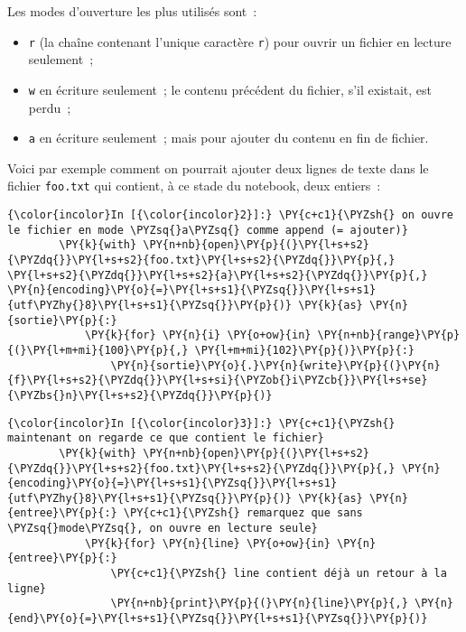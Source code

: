     Les modes d'ouverture les plus utilisés sont~:
  
\begin{itemize}
	\item
	\texttt{\textquotesingle{}r\textquotesingle{}} (la chaîne contenant
	l'unique caractère \texttt{r}) pour ouvrir un fichier en lecture
	seulement~;
	\item
	\texttt{\textquotesingle{}w\textquotesingle{}} en écriture
	seulement~; le contenu précédent du fichier, s'il existait, est perdu~;
	\item
	\texttt{\textquotesingle{}a\textquotesingle{}} en écriture seulement~;
	mais pour ajouter du contenu en fin de fichier.
\end{itemize}

    Voici par exemple comment on pourrait ajouter deux lignes de texte dans
le fichier \texttt{foo.txt} qui contient, à ce stade du notebook, deux
entiers~:

    \begin{Verbatim}[commandchars=\\\{\}]
{\color{incolor}In [{\color{incolor}2}]:} \PY{c+c1}{\PYZsh{} on ouvre le fichier en mode \PYZsq{}a\PYZsq{} comme append (= ajouter)}
        \PY{k}{with} \PY{n+nb}{open}\PY{p}{(}\PY{l+s+s2}{\PYZdq{}}\PY{l+s+s2}{foo.txt}\PY{l+s+s2}{\PYZdq{}}\PY{p}{,} \PY{l+s+s2}{\PYZdq{}}\PY{l+s+s2}{a}\PY{l+s+s2}{\PYZdq{}}\PY{p}{,} \PY{n}{encoding}\PY{o}{=}\PY{l+s+s1}{\PYZsq{}}\PY{l+s+s1}{utf\PYZhy{}8}\PY{l+s+s1}{\PYZsq{}}\PY{p}{)} \PY{k}{as} \PY{n}{sortie}\PY{p}{:}
            \PY{k}{for} \PY{n}{i} \PY{o+ow}{in} \PY{n+nb}{range}\PY{p}{(}\PY{l+m+mi}{100}\PY{p}{,} \PY{l+m+mi}{102}\PY{p}{)}\PY{p}{:}
                \PY{n}{sortie}\PY{o}{.}\PY{n}{write}\PY{p}{(}\PY{n}{f}\PY{l+s+s2}{\PYZdq{}}\PY{l+s+si}{\PYZob{}i\PYZcb{}}\PY{l+s+se}{\PYZbs{}n}\PY{l+s+s2}{\PYZdq{}}\PY{p}{)}
\end{Verbatim}


    \begin{Verbatim}[commandchars=\\\{\}]
{\color{incolor}In [{\color{incolor}3}]:} \PY{c+c1}{\PYZsh{} maintenant on regarde ce que contient le fichier}
        \PY{k}{with} \PY{n+nb}{open}\PY{p}{(}\PY{l+s+s2}{\PYZdq{}}\PY{l+s+s2}{foo.txt}\PY{l+s+s2}{\PYZdq{}}\PY{p}{,} \PY{n}{encoding}\PY{o}{=}\PY{l+s+s1}{\PYZsq{}}\PY{l+s+s1}{utf\PYZhy{}8}\PY{l+s+s1}{\PYZsq{}}\PY{p}{)} \PY{k}{as} \PY{n}{entree}\PY{p}{:} \PY{c+c1}{\PYZsh{} remarquez que sans \PYZsq{}mode\PYZsq{}, on ouvre en lecture seule}
            \PY{k}{for} \PY{n}{line} \PY{o+ow}{in} \PY{n}{entree}\PY{p}{:}
                \PY{c+c1}{\PYZsh{} line contient déjà un retour à la ligne}
                \PY{n+nb}{print}\PY{p}{(}\PY{n}{line}\PY{p}{,} \PY{n}{end}\PY{o}{=}\PY{l+s+s1}{\PYZsq{}}\PY{l+s+s1}{\PYZsq{}}\PY{p}{)}
\end{Verbatim}


